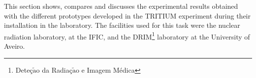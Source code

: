 This section shows, compares and discusses the experimental results obtained with the different prototypes developed in the TRITIUM experiment during their installation in the laboratory. The facilities used for this task were the nuclear radiation laboratory, at the IFIC, and the DRIM\footnote{Deteç$\tilde{\text{a}}$o da Radiaç$\tilde{\text{a}}$o e Imagem Médica} laboratory at the University of Aveiro.
